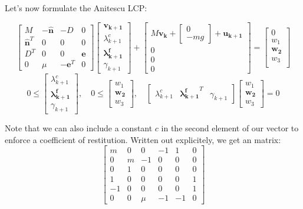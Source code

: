 \documentclass{article}
\renewcommand{\vec}[1]{\boldsymbol{#1}}
\newcommand{\rvec}[1]{\begin{bmatrix} #1 \end{bmatrix}}
\begin{document}
Let's now formulate the Anitescu LCP:

\[
    \begin{bmatrix}
        M & - \vec{\hat n} & -D & 0 \\
        \vec{\hat n}^T & 0 & 0 & 0 \\
        D^T & 0 & 0 & \vec{e} \\
        0 & \mu & -\vec{e}^T & 0
    \end{bmatrix}
    \begin{bmatrix}
        \vec{v_{k+1}} \\
        \lambda^c_{k+1} \\
        \vec{\lambda^f_{k+1}} \\
        \gamma_{k+1}
    \end{bmatrix}
    +
    \begin{bmatrix}
        M \vec{v_k} + \rvec{0 \\ -m g} + \vec{u_{k+1}} \\
        0 \\
        0 \\
        0
    \end{bmatrix}
    =
    \begin{bmatrix}
        0 \\
        w_1 \\
        \vec{w_2} \\
        w_3 \\
    \end{bmatrix}
\]
\[
    0 \leq 
    \begin{bmatrix}
        \lambda^c_{k+1} \\
        \vec{\lambda^f_{k+1}} \\
        \gamma_{k+1}
    \end{bmatrix}, \quad
    0 \leq 
    \begin{bmatrix}
        w_1 \\
        \vec{w_2} \\
        w_3
    \end{bmatrix}, \quad
    \begin{bmatrix}
        \lambda^c_{k+1} &
        \vec{\lambda^f_{k+1}}^T &
        \gamma_{k+1}
    \end{bmatrix}
    \begin{bmatrix}
        w_1 \\
        \vec{w_2} \\
        w_3
    \end{bmatrix}
    = 0
\]

Note that we can also include a constant $c$ in the second element of our vector to enforce a coefficient of restitution. Written out explicitely, we get an matrix:
\[
    \begin{bmatrix}
        m & 0 & 0 & -1 & 1 & 0 \\
        0 & m & -1 & 0 & 0 & 0 \\
        0 & 1 & 0 & 0 & 0 & 0 \\
        1 & 0 & 0 & 0 & 0 & 1 \\
        -1 & 0 & 0 & 0 & 0 & 1 \\
        0 & 0 & \mu & -1 & -1 & 0
    \end{bmatrix}
\]
\end{document}

